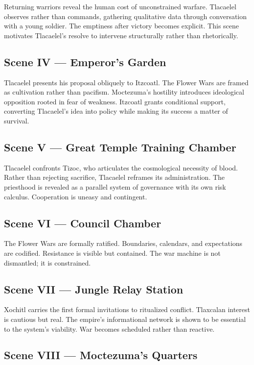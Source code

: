 \documentclass[12pt]{article}
\begin{document}
Returning warriors reveal the human cost of unconstrained warfare. Tlacaelel observes rather than commands, gathering qualitative data through conversation with a young soldier. The emptiness after victory becomes explicit. This scene motivates Tlacaelel's resolve to intervene structurally rather than rhetorically.

\subsection*{Scene IV — Emperor's Garden}

Tlacaelel presents his proposal obliquely to Itzcoatl. The Flower Wars are framed as cultivation rather than pacifism. Moctezuma's hostility introduces ideological opposition rooted in fear of weakness. Itzcoatl grants conditional support, converting Tlacaelel's idea into policy while making its success a matter of survival.

\subsection*{Scene V — Great Temple Training Chamber}

Tlacaelel confronts Tizoc, who articulates the cosmological necessity of blood. Rather than rejecting sacrifice, Tlacaelel reframes its administration. The priesthood is revealed as a parallel system of governance with its own risk calculus. Cooperation is uneasy and contingent.

\subsection*{Scene VI — Council Chamber}

The Flower Wars are formally ratified. Boundaries, calendars, and expectations are codified. Resistance is visible but contained. The war machine is not dismantled; it is constrained.

\subsection*{Scene VII — Jungle Relay Station}

Xochitl carries the first formal invitations to ritualized conflict. Tlaxcalan interest is cautious but real. The empire's informational network is shown to be essential to the system's viability. War becomes scheduled rather than reactive.

\subsection*{Scene VIII — Moctezuma's Quarters}
\end{document}
